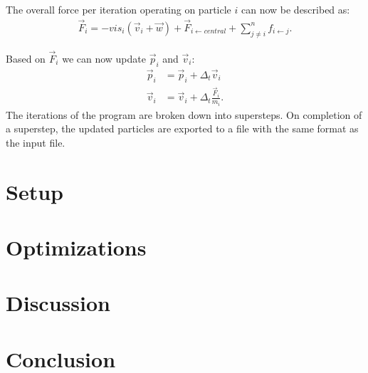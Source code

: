 \documentclass[twoside,11pt]{article}
\begin{document}
The overall force per iteration operating on particle $i$ can now
be described as:
\begin{align}
  \vec{F}_i = -vis_i(\vec{v}_i + \vec{w}) +
              \vec{F}_{i \leftarrow central} +
              \sum_{j\neq i}^n f_{i \leftarrow j}.
\end{align}

Based on $\vec{F}_i$ we can now update $\vec{p}_i$ and $\vec{v}_i$:
\begin{align}
  \vec{p}_i &= \vec{p}_i + \Delta_t \vec{v}_i \\
  \vec{v}_i &= \vec{v}_i + \Delta_t \frac{\vec{F}_i}{m_i}.
\end{align}
The iterations of the program are broken down into supersteps.
On completion of a superstep, the updated particles are exported to a
file with the same format as the input file.


\section{Setup} %
\label{sec:setup}




\section{Optimizations} %
\label{sec:opt}


\section{Discussion} %
\label{sec:dis}


\section{Conclusion} %
\label{sec:con}



\end{document}
